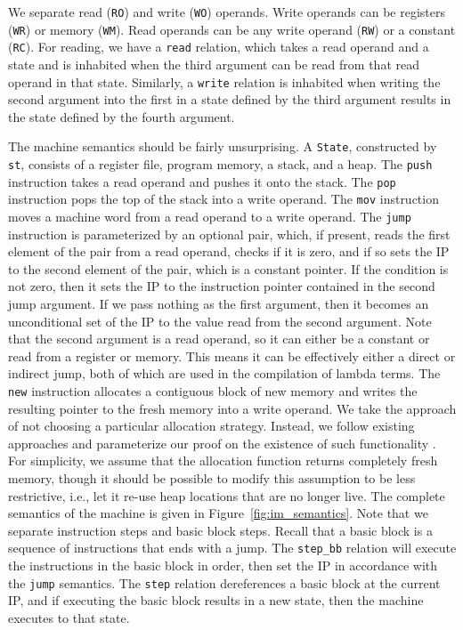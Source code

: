 We separate read (\texttt{RO}) and write (\texttt{WO}) operands. Write
operands can be registers (\texttt{WR}) or memory (\texttt{WM}). Read operands
can be any write operand (\texttt{RW}) or a constant (\texttt{RC}). For reading,
we have a \texttt{read} relation, which takes a read operand and a state and is
inhabited when the third argument can be read from that read operand in that
state. Similarly, a \texttt{write} relation is inhabited when writing the second
argument into the first in a state defined by the third argument results in the
state defined by the fourth argument.  

The machine semantics should be fairly unsurprising. A \texttt{State},
constructed by \texttt{st}, consists of a register file, program memory, a
stack, and a heap. The \texttt{push} instruction takes a read operand and pushes
it onto the stack. The \texttt{pop} instruction pops the top of the stack into a
write operand. The \texttt{mov} instruction moves a machine word from a read
operand to a write operand. The \texttt{jump} instruction is parameterized by an
optional pair, which, if present, reads the first element of the pair from a read
operand, checks if it is zero, and if so sets the IP to the second element of
the pair, which is a constant pointer. If the condition is not zero, then it
sets the IP to the instruction pointer contained in the second jump argument. If
we pass nothing as the first argument, then it becomes an unconditional set of
the IP to the value read from the second argument.  Note that the second
argument is a read operand, so it can either be a constant or read from a register
or memory. This means it can be effectively either a direct or indirect jump,
both of which are used in the compilation of lambda terms. The \texttt{new}
instruction allocates a contiguous block of new memory and writes the resulting
pointer to the fresh memory into a write operand. We take the approach of not
choosing a particular allocation strategy. Instead, we follow existing
approaches and parameterize our proof on the existence of such functionality
\cite{chlipala2007certified}. For simplicity, we assume that the allocation
function returns completely fresh memory, though it should be possible to modify
this assumption to be less restrictive, i.e., let it re-use heap locations that
are no longer live. The complete semantics of the machine is given in
Figure~\ref{fig:im_semantics}.  Note that we separate instruction steps and
basic block steps. Recall that a basic block is a sequence of instructions that
ends with a jump. The \texttt{step\_bb} relation will execute the instructions
in the basic block in order, then set the IP in accordance with the
\texttt{jump} semantics. The \texttt{step} relation dereferences a basic block
at the current IP, and if executing the basic block results in a new state, then
the machine executes to that state. 

